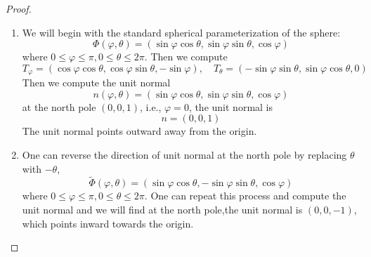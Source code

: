 \documentclass[openany]{book}
\begin{document}
\begin{proof}
    \begin{enumerate}
        \item[(a)] We will begin with the standard spherical parameterization of the sphere: 
        \begin{equation*}
            \Phi(\varphi,\theta)=(\sin\varphi\cos\theta,\sin\varphi\sin\theta,\cos\varphi)
        \end{equation*}
        where $0\leq\varphi\leq\pi, 0\leq\theta\leq2\pi$. Then we compute 
        \begin{equation*}
            T_\varphi=(\cos\varphi\cos\theta, \cos\varphi\sin\theta,-\sin\varphi), \quad T_\theta=(-\sin\varphi\sin\theta, \sin\varphi\cos\theta, 0)
        \end{equation*}
        Then we compute the unit normal
        \begin{equation*}
            n(\varphi,\theta)=(\sin\varphi\cos\theta, \sin\varphi\sin\theta, \cos\varphi)
        \end{equation*}
        at the north pole $(0,0,1)$, i.e., $\varphi=0$, the unit normal is
        \begin{equation*}
            n=(0,0,1)
        \end{equation*}
        The unit normal points outward away from the origin.
        \item[(b)] One can reverse the direction of unit normal at the north pole by replacing $\theta$ with $-\theta$,
        \begin{equation*}
            \tilde{\Phi}(\varphi,\theta)=(\sin\varphi\cos\theta,-\sin\varphi\sin\theta,\cos\varphi)
        \end{equation*}
        where $0\leq\varphi\leq\pi, 0\leq\theta\leq2\pi$. One can repeat this process and compute the unit normal and we will find at the north pole,the unit normal is $(0,0,-1)$, which points inward towards the origin.


\end{enumerate}
\end{proof}
\end{document}
